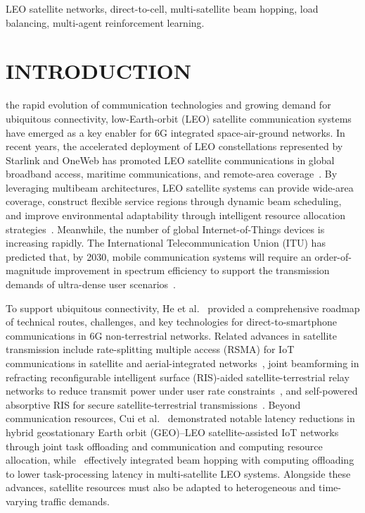 \documentclass[journal]{IEEEtran}
\begin{document}
\begin{IEEEkeywords}
LEO satellite networks, direct-to-cell, multi-satellite beam hopping, load balancing, multi-agent reinforcement learning.
\end{IEEEkeywords}

\section{INTRODUCTION}
\label{sec:introduction}
 the rapid evolution of communication technologies and growing demand for ubiquitous connectivity, low-Earth-orbit (LEO) satellite communication systems have emerged as a key enabler for 6G integrated space-air-ground networks. In recent years, the accelerated deployment of LEO constellations represented by Starlink and OneWeb has promoted LEO satellite communications in global broadband access, maritime communications, and remote-area coverage~\cite{ref1,ref2}. By leveraging multibeam architectures, LEO satellite systems can provide wide-area coverage, construct flexible service regions through dynamic beam scheduling, and improve environmental adaptability through intelligent resource allocation strategies~\cite{ref3}. Meanwhile, the number of global Internet-of-Things devices is increasing rapidly. The International Telecommunication Union (ITU) has predicted that, by 2030, mobile communication systems will require an order-of-magnitude improvement in spectrum efficiency to support the transmission demands of ultra-dense user scenarios~\cite{ref4}.

To support ubiquitous connectivity, He et al.~\cite{refD2S} provided a comprehensive roadmap of technical routes, challenges, and key technologies for direct-to-smartphone communications in 6G non-terrestrial networks. Related advances in satellite transmission include rate-splitting multiple access (RSMA) for IoT communications in satellite and aerial-integrated networks~\cite{refRSMA}, joint beamforming in refracting reconfigurable intelligent surface (RIS)-aided satellite-terrestrial relay networks to reduce transmit power under user rate constraints~\cite{refRefractingRIS}, and self-powered absorptive RIS for secure satellite-terrestrial transmissions~\cite{refSecureRIS}. Beyond communication resources, Cui et al.~\cite{refCuiLatency2023} demonstrated notable latency reductions in hybrid geostationary Earth orbit (GEO)--LEO satellite-assisted IoT networks through joint task offloading and communication and computing resource allocation, while~\cite{refCuiOffloading2026} effectively integrated beam hopping with computing offloading to lower task-processing latency in multi-satellite LEO systems. Alongside these advances, satellite resources must also be adapted to heterogeneous and time-varying traffic demands.
\end{document}
